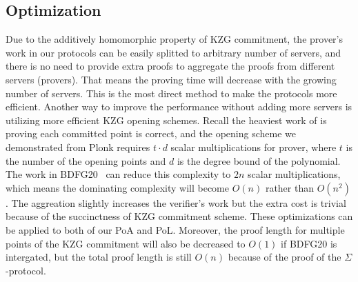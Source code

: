 \subsection{Optimization}
\label{sec:opt}
Due to the additively homomorphic property of KZG commitment, the prover's work in our protocols can be easily splitted to arbitrary number of servers, and there is no need to provide extra proofs to aggregate the proofs from different servers (provers). That means the proving time will decrease with the growing number of servers. This is the most direct method to make the protocols more efficient. Another way to improve the performance without adding more servers is utilizing more efficient KZG opening schemes. Recall the heaviest work of \bootstrap is proving each committed point is correct, and the opening scheme we demonstrated from Plonk requires $t\cdot{d}$ scalar multiplications for prover, where $t$ is the number of the opening points and $d$ is the degree bound of the polynomial. The work in BDFG20~\cite{bdfg} can reduce this complexity to $2n$ scalar multiplications, which means the dominating complexity will become $O(n)$ rather than $O(n^2)$. The aggreation slightly increases the verifier's work but the extra cost is trivial because of the succinctness of KZG commitment scheme. These optimizations can be applied to both of our PoA and PoL. Moreover, the proof length for multiple points of the KZG commitment will also be decreased to $O(1)$ if BDFG20 is intergated, but the total proof length is still $O(n)$ because of the proof of the $\Sigma$-protocol.



